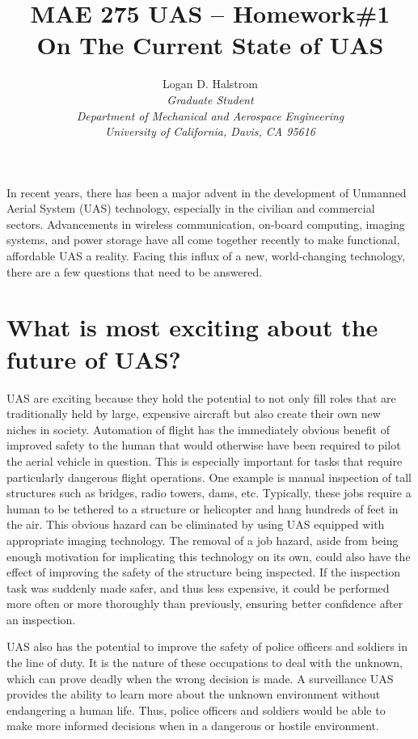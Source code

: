\documentclass[]{aiaa-tc}%
\title{MAE 275 UAS -- Homework\#1 \\ On The Current State of UAS}
\author{
  Logan D. Halstrom \\
  {\normalsize\itshape Graduate Student} \\
  {\normalsize\itshape Department of Mechanical and Aerospace Engineering} \\
  {\normalsize\itshape University of California, Davis, CA 95616}
       }
\begin{document}
\maketitle


In recent years, there has been a major advent in the development of Unmanned Aerial System (UAS) technology, especially in the civilian and commercial sectors.  Advancements in wireless communication, on-board computing, imaging systems, and power storage have all come together recently to make functional, affordable UAS a reality.  Facing this influx of a new, world-changing technology, there are a few questions that need to be answered.

\section*{What is most exciting about the future of UAS?}

UAS are exciting because they hold the potential to not only fill roles that are traditionally held by large, expensive aircraft but also create their own new niches in society.  Automation of flight has the immediately obvious benefit of improved safety to the human that would otherwise have been required to pilot the aerial vehicle in question.  This is especially important for tasks that require particularly dangerous flight operations.  One example is manual inspection of tall structures such as bridges, radio towers, dams, etc.  Typically, these jobs require a human to be tethered to a structure or helicopter and hang hundreds of feet in the air.  This obvious hazard can be eliminated by using UAS equipped with appropriate imaging technology.  The removal of a job hazard, aside from being enough motivation for implicating this technology on its own, could also have the effect of improving the safety of the structure being inspected.  If the inspection task was suddenly made safer, and thus less expensive, it could be performed more often or more thoroughly than previously, ensuring better confidence after an inspection.

UAS also has the potential to improve the safety of police officers and soldiers in the line of duty.  It is the nature of these occupations to deal with the unknown, which can prove deadly when the wrong decision is made.  A surveillance UAS provides the ability to learn more about the unknown environment without endangering a human life.  Thus, police officers and soldiers would be able to make more informed decisions when in a dangerous or hostile environment.
\end{document}
